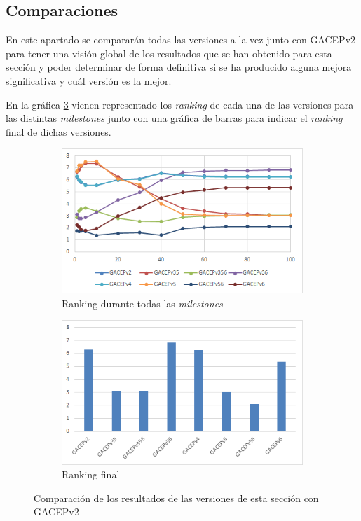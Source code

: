 \subsection{Comparaciones}

En este apartado se compararán todas las versiones a la vez junto con GACEPv2 para tener una visión global de los resultados que se han obtenido para esta sección y poder determinar de forma definitiva si se ha producido alguna mejora significativa y cuál versión es la mejor. 

En la gráfica \ref{fig:GACEP3103vsGACEPv2} vienen representado los \textit{ranking} de cada una de las versiones para las distintas \textit{milestones} junto con una gráfica de barras  para indicar el \textit{ranking} final de dichas versiones. 

\begin{figure}[h]
     \centering
     \begin{subfigure}[b]{0.45\textwidth}
         \centering
         \includegraphics[width=\textwidth]{imagenes/Experimental/GACEP3103vsGACEPv2.png}
         \caption{Ranking durante todas las \textit{milestones}}
         \label{fig:GACEP3103vsGACEPv2_lineas}
     \end{subfigure}
     \hfill
     \begin{subfigure}[b]{0.45\textwidth}
         \centering
         \includegraphics[width=\textwidth]{imagenes/Experimental/barras/GACEP3103vsGACEPv2.png}
         \caption{Ranking final}
         \label{fig:GACEP3103vsGACEPv2_barras}
     \end{subfigure}
        \caption{Comparación de los resultados de las versiones de esta sección con GACEPv2}
        \label{fig:GACEP3103vsGACEPv2}
\end{figure}

